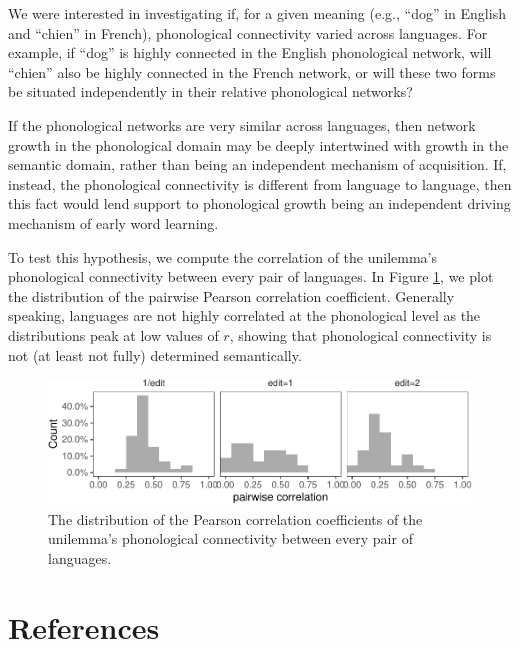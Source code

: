 \documentclass[english,,man,floatsintext]{apa6}
\begin{document}
We were interested in investigating if, for a given meaning (e.g., \enquote{dog} in English and \enquote{chien} in French), phonological connectivity varied across languages. For example, if \enquote{dog} is highly connected in the English phonological network, will \enquote{chien} also be highly connected in the French network, or will these two forms be situated independently in their relative phonological networks?

If the phonological networks are very similar across languages, then network growth in the phonological domain may be deeply intertwined with growth in the semantic domain, rather than being an independent mechanism of acquisition. If, instead, the phonological connectivity is different from language to language, then this fact would lend support to phonological growth being an independent driving mechanism of early word learning.

To test this hypothesis, we compute the correlation of the unilemma's phonological connectivity between every pair of languages. In Figure \ref{fig:corrPair}, we plot the distribution of the pairwise Pearson correlation coefficient. Generally speaking, languages are not highly correlated at the phonological level as the distributions peak at low values of \(r\), showing that phonological connectivity is not (at least not fully) determined semantically.

\begin{figure}[!h]
\includegraphics[width=\textwidth]{ms_files/figure-latex/corrPair-1} \caption{The distribution of the Pearson correlation coefficients of the unilemma's phonological connectivity between every pair of languages.}\label{fig:corrPair}
\end{figure}

\newpage

\hypertarget{references}{%
\section{References}\label{references}}

\setlength{\parindent}{-0.5in}
\setlength{\leftskip}{0.5in}
\end{document}
